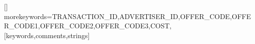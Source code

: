 \usepackage[utf8x]{inputenc}
\usepackage[T2A]{fontenc}
\usepackage[english, russian]{babel}

\usepackage{cyrtimes}

\usepackage{graphicx}
\usepackage{tikz}
\usetikzlibrary{snakes,arrows,shapes}


\usepackage{misccorr}
\usepackage{indentfirst}
\renewcommand{\labelitemi}{\normalfont\bfseries{--}}

\topmargin -1cm
\oddsidemargin -0.5cm
\evensidemargin -0.5cm
\textwidth 17cm
\textheight 24cm

\sloppy

\usepackage[
bookmarks=true,
colorlinks=true, linkcolor=black, anchorcolor=black, citecolor=black, menucolor=black,filecolor=black, urlcolor=black,
unicode=true
]{hyperref}

\usepackage{listings}

\lstset{
  basicstyle=\ttfamily,
  columns=fullflexible,
  breaklines=true,       %
  showspaces=false,      %
  showstringspaces=false,
  showtabs=false,        %
  stepnumber=1,
  tabsize=4,              %
  frame=single
}

[]{}{
  morekeywords={TRANSACTION_ID,ADVERTISER_ID,OFFER_CODE,OFFER_CODE1,OFFER_CODE2,OFFER_CODE3,COST},
}[keywords,comments,strings]

\newcommand{\Code}[1]{\texttt{#1}}

\newcommand{\heymoose}{<<HeyMoose!>>}
